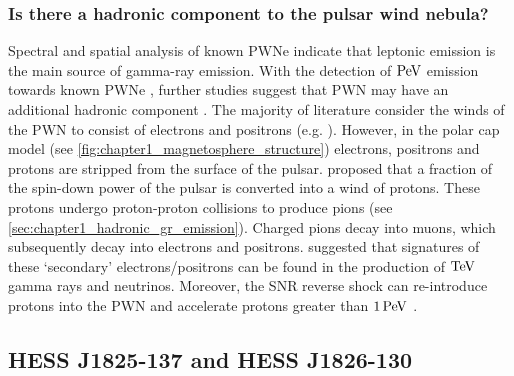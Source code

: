 \subsubsection{Is there a hadronic component to the pulsar wind nebula?}

Spectral and spatial analysis of known PWNe indicate that leptonic emission is the main source of gamma-ray emission. With the detection of $\PeV$ emission towards known PWNe \citep{doi:10.1126/science.abg5137}, further studies suggest that PWN may have an additional hadronic component \citep{10.1111/j.1745-3933.2010.00934.x, Xin_2019, 2021ApJ...922..221L}. The majority of literature consider the winds of the PWN to consist of electrons and positrons (e.g. \cite{2018A&A...612A...2H}). However, in the polar cap model (see \autoref{fig:chapter1_magnetosphere_structure}) electrons, positrons and protons are stripped from the surface of the pulsar. \cite{1994ApJ...435..230G} proposed that a fraction of the spin-down power of the pulsar is converted into a wind of protons. These protons undergo proton-proton collisions to produce pions (see \autoref{sec:chapter1_hadronic_gr_emission}). Charged pions decay into muons, which subsequently decay into electrons and positrons. \cite{2003A&A...402..827A} suggested that signatures of these `secondary' electrons/positrons can be found in the production of $\TeV$ gamma rays and neutrinos. Moreover, the SNR reverse shock can re-introduce protons into the PWN and accelerate protons greater than $1\,\PeV$ \citep{1992MNRAS.257..493B,2018MNRAS.478..926O}.


\subsection{HESS J1825-137 and HESS J1826-130} \label{sec:01_1825_1826}


